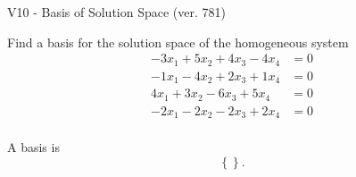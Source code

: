 \begin{exercise}
  \begin{exerciseTitle}V10 - Basis of Solution Space (ver. 781)\end{exerciseTitle}
  \begin{exerciseStatement}
    Find a basis for the solution space of the homogeneous system 
\begin{align*}
 -3 x_ 1 + 5 x_ 2 + 4 x_ 3 -4 x_ 4 &= 0  \\ 
  -1 x_ 1 -4 x_ 2 + 2 x_ 3 + 1 x_ 4 &= 0  \\ 
  4 x_ 1 + 3 x_ 2 -6 x_ 3 + 5 x_ 4 &= 0  \\ 
  -2 x_ 1 -2 x_ 2 -2 x_ 3 + 2 x_ 4 &= 0  \\ 
 \end{align*}


 
  \end{exerciseStatement}

  \begin{exerciseAnswer}
   A basis is   
\[\left\{\right\}.\]

  


  \end{exerciseAnswer}
\end{exercise}